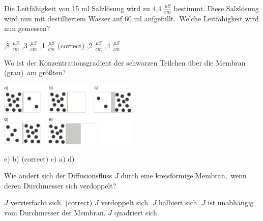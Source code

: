 \documentclass[11pt]{exam}
\begin{document}
\setlength{\voffset}{-0.5in}
\setlength{\headsep}{5pt}

\hspace{2mm}
 \hspace{5mm}
\vspace{4mm}

\begin{questions}

\question Die Leitfähigkeit von 15 ml Salzlösung wird zu 4,4 \( \frac{\mu S}{cm} \) bestimmt. Diese Salzlösung wird nun mit destilliertem Wasser auf 60 ml aufgefüllt. Welche Leitfähigkeit wird nun gemessen?

\begin{choices}
	,8 \(   \frac{\mu S}{cm}  \)
	,3 \(   \frac{\mu S}{cm}  \)
	,1 \(   \frac{\mu S}{cm}  \) (correct)
	,2 \(   \frac{\mu S}{cm}  \)
	,4 \(   \frac{\mu S}{cm}  \)
\end{choices}

\vspace{3mm}\question Wo ist der Konzentrationsgradient der schwarzen Teilchen über die Membran (grau) am größten? 

\includegraphics[width=0.5\textwidth]{../../../questions/E/images/Diffusion.png}

\begin{choices}
	\choice e)
	\choice b) (correct)
	\choice c)
	\choice a)
	\choice d)
\end{choices}

\vspace{3mm}\question Wie ändert sich der Diffusionsfluss \( J \) durch eine kreisförmige Membran, wenn deren Durchmesser sich verdoppelt?

\begin{choices}
	\choice \( J \) vervierfacht sich. (correct)
	\choice \( J \) verdoppelt sich.
	\choice \( J \) halbiert sich.
	\choice \( J \) ist unabhängig vom Durchmesser der Membran.
	\choice \( J \) quadriert sich.
\end{choices}


\end{questions}
\end{document}
